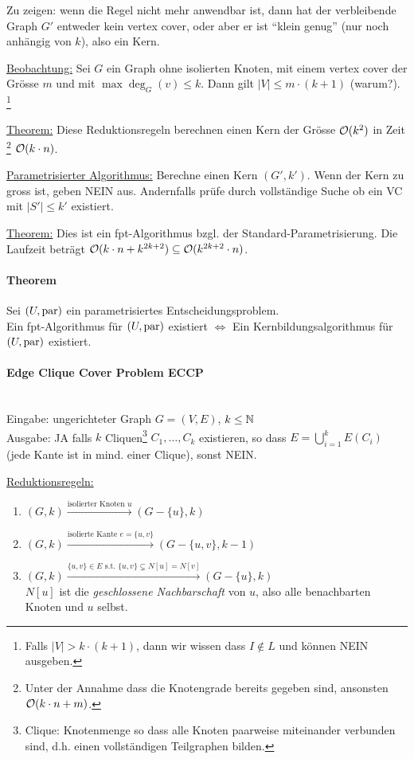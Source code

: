 Zu zeigen: wenn die Regel nicht mehr anwendbar ist, dann hat der verbleibende Graph $G'$ entweder kein vertex cover,
oder aber er ist ``klein genug'' (nur noch anhängig von $k$), also ein Kern.

\underline{Beobachtung:}
Sei $G$ ein Graph ohne isolierten Knoten, mit einem vertex cover der Grösse $m$ und mit $\max \deg_G(v) \leq k$.
Dann gilt $|V| \leq m \cdot (k+1)$ (warum?).%
\footnote{Falls $|V| > k \cdot (k+1)$, dann wir wissen dass $ I \notin L$ und können NEIN ausgeben.}

\underline{Theorem:}
Diese Reduktionsregeln berechnen einen Kern der Grösse $\mathcal{O} (k^2)$ in Zeit%
\footnote{Unter der Annahme dass die Knotengrade bereits gegeben sind, ansonsten $\mathcal{O} (k \cdot n + m)$.}
$\mathcal{O} (k \cdot n)$.

\underline{Parametrisierter Algorithmus:}
Berechne einen Kern $(G', k')$. Wenn der Kern zu gross ist, geben NEIN aus.
Andernfalls prüfe durch vollständige Suche ob ein VC mit $|S'| \leq k'$ existiert.

\underline{Theorem:}
Dies ist ein fpt-Algorithmus bzgl. der Standard-Parametrisierung. Die Laufzeit beträgt
$\mathcal{O} (k \cdot n + k^{2k+2}) \subseteq \mathcal{O} (k^{2k+2} \cdot n)$.

\paragraph{Theorem}
Sei $(U, \text{par})$ ein parametrisiertes Entscheidungsproblem. \\
Ein fpt-Algorithmus für $(U, \text{par})$ existiert $\iff$ Ein Kernbildungsalgorithmus für $(U, \text{par})$ existiert.

\paragraph{Edge Clique Cover Problem ECCP} \mbox{} \\
Eingabe: ungerichteter Graph $G=(V,E)$, $k \leq \mathbb{N}$ \\
Ausgabe: JA falls $k$ Cliquen\footnote{Clique: Knotenmenge so dass alle Knoten paarweise miteinander verbunden sind,
d.h. einen vollständigen Teilgraphen bilden.}
$C_1, \dots, C_k$ existieren, so dass $E = \bigcup_{i=1}^k E(C_i)$ (jede Kante ist in mind. einer Clique), sonst NEIN.

\underline{Reduktionsregeln:}
\begin{enumerate}[label=(\roman*)]
    \item $(G, k) \xrightarrow{\text{isolierter Knoten } u} (G-\{ u \}, k)$
    \item $(G, k) \xrightarrow{\text{isolierte Kante } e=\{u,v\} } (G-\{ u,v \}, k-1)$
    \item $(G, k) \xrightarrow{\{u,v\} \in E \text{ s.t. } \{u,v\} \subsetneq N[u] = N[v] } (G-\{ u \}, k)$ \\
    $N[u]$ ist die \emph{geschlossene Nachbarschaft} von $u$, also alle benachbarten Knoten und $u$ selbst.
\end{enumerate}

